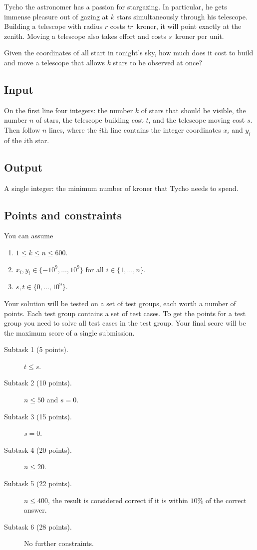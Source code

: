 
Tycho the astronomer has a passion for stargazing.
In particular, he gets immense pleasure out of gazing at $k$ stars simultaneously through his telescope.   
Building a telescope with radius $r$ costs $tr$~kroner, it will point exactly at the zenith.
Moving a telescope also takes effort and costs $s$~kroner per unit.

Given the coordinates of all start in tonight's sky, how much does it cost to build and move a telescope that allows $k$ stars to be observed at once?

\subsection*{Input}

On the first line four integers: the number $k$ of stars that should be visible, the number $n$ of stars, the telescope building cost $t$, and the telescope moving cost $s$.
Then follow $n$ lines, where the $i$th line contains the integer coordinates $x_i$ and $y_i$ of the $i$th star.

\subsection*{Output}

A single integer: the minimum number of kroner that Tycho needs to spend.

\subsection*{Points and constraints}

You can assume 
\begin{enumerate}
\item $1\leq k\leq n\leq 600$.
\item $x_i, y_i\in \{-10^9,\ldots, 10^9\}$ for all $i\in\{1,\ldots,n\}$.
\item $s, t\in \{0,\ldots, 10^9\}$.
\end{enumerate}

Your solution will be tested on a set of test groups, each worth a number of points.
Each test group contains a set of test cases.
To get the points for a test group you need to solve all test cases in the test group.
Your final score will be the maximum score of a single submission.

\begin{description}
\item[Subtask 1 (5 points).] $t\leq s$.
\item[Subtask 2 (10 points).] $n\le 50$ and $s=0$.
\item[Subtask 3 (15 points).] $s=0$.
\item[Subtask 4 (20 points).] $n\leq 20$.
\item[Subtask 5 (22 points).] $n\leq 400$, the result is considered correct if it is within $10\%$ of the correct answer.
\item[Subtask 6 (28 points).] No further constraints.
\end{description}
